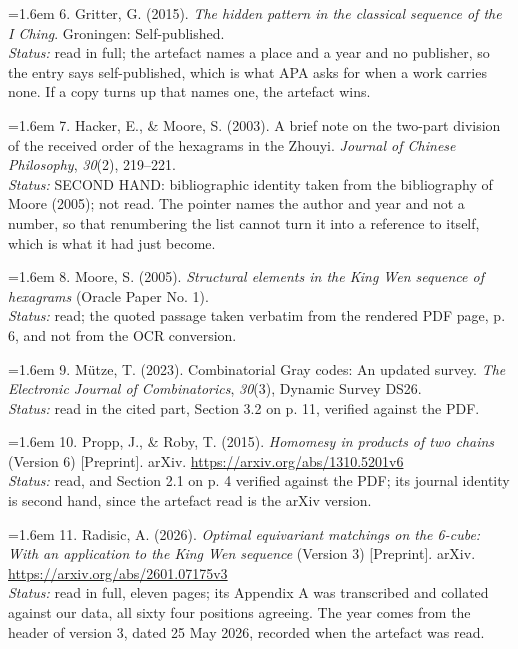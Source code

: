 \documentclass[11pt,a4paper]{article}
\begin{document}
\hangindent=1.6em 6. Gritter, G. (2015). \emph{The hidden pattern in the classical sequence of the I Ching}. Groningen: Self-published.\\ \emph{Status:} read in full; the artefact names a place and a year and no publisher, so the entry says self-published, which is what APA asks for when a work carries none. If a copy turns up that names one, the artefact wins.\par\vspace{0.5ex}
\hangindent=1.6em 7. Hacker, E., \& Moore, S. (2003). A brief note on the two-part division of the received order of the hexagrams in the Zhouyi. \emph{Journal of Chinese Philosophy}, \emph{30}(2), 219–221.\\ \emph{Status:} SECOND HAND: bibliographic identity taken from the bibliography of Moore (2005); not read. The pointer names the author and year and not a number, so that renumbering the list cannot turn it into a reference to itself, which is what it had just become.\par\vspace{0.5ex}
\hangindent=1.6em 8. Moore, S. (2005). \emph{Structural elements in the King Wen sequence of hexagrams} (Oracle Paper No. 1).\\ \emph{Status:} read; the quoted passage taken verbatim from the rendered PDF page, p. 6, and not from the OCR conversion.\par\vspace{0.5ex}
\hangindent=1.6em 9. Mütze, T. (2023). Combinatorial Gray codes: An updated survey. \emph{The Electronic Journal of Combinatorics}, \emph{30}(3), Dynamic Survey DS26.\\ \emph{Status:} read in the cited part, Section 3.2 on p. 11, verified against the PDF.\par\vspace{0.5ex}
\hangindent=1.6em 10. Propp, J., \& Roby, T. (2015). \emph{Homomesy in products of two chains} (Version 6) [Preprint]. arXiv. \url{https://arxiv.org/abs/1310.5201v6}\\ \emph{Status:} read, and Section 2.1 on p. 4 verified against the PDF; its journal identity is second hand, since the artefact read is the arXiv version.\par\vspace{0.5ex}
\hangindent=1.6em 11. Radisic, A. (2026). \emph{Optimal equivariant matchings on the 6-cube: With an application to the King Wen sequence} (Version 3) [Preprint]. arXiv. \url{https://arxiv.org/abs/2601.07175v3}\\ \emph{Status:} read in full, eleven pages; its Appendix A was transcribed and collated against our data, all sixty four positions agreeing. The year comes from the header of version 3, dated 25 May 2026, recorded when the artefact was read.\par\vspace{0.5ex}
\end{document}
